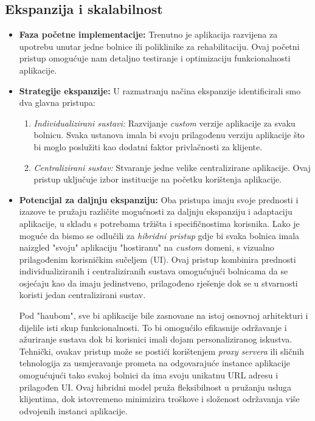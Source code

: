         \subsection*{Ekspanzija i skalabilnost}
        \begin{itemize}
            \item \textbf{Faza početne implementacije:} Trenutno je aplikacija razvijena za upotrebu unutar jedne bolnice ili poliklinike za rehabilitaciju. Ovaj početni pristup omogućuje nam detaljno testiranje i optimizaciju funkcionalnosti aplikacije.
            
            \item \textbf{Strategije ekspanzije:} U razmatranju načina ekspanzije identificirali smo dva glavna pristupa:
                \begin{enumerate}
                    \item \textit{Individualizirani sustavi:} Razvijanje \textit{custom} verzije aplikacije za svaku bolnicu. Svaka ustanova imala bi svoju prilagođenu verziju aplikacije što bi moglo poslužiti kao dodatni faktor privlačnosti za klijente.
                    
                    \item \textit{Centralizirani sustav:} Stvaranje jedne velike centralizirane aplikacije. Ovaj pristup uključuje izbor institucije na početku korištenja aplikacije.
                \end{enumerate}
            
            \item \textbf{Potencijal za daljnju ekspanziju:} Oba pristupa imaju svoje prednosti i izazove te pružaju različite mogućnosti za daljnju ekspanziju i adaptaciju aplikacije, u skladu s potrebama tržišta i specifičnostima korisnika. Lako je moguće da bismo se odlučili za \textit{hibridni pristup} gdje bi svaka bolnica imala naizgled "svoju" aplikaciju "hostiranu" na \textit{custom} domeni, s vizualno prilagođenim korisničkim sučeljem (UI). Ovaj pristup kombinira prednosti individualiziranih i centraliziranih sustava omogućujući bolnicama da se osjećaju kao da imaju jedinstveno, prilagođeno rješenje dok se u stvarnosti koristi jedan centralizirani sustav.

            Pod "haubom", sve bi aplikacije bile zasnovane na istoj osnovnoj arhitekturi i dijelile isti skup funkcionalnosti. To bi omogućilo efikasnije održavanje i ažuriranje sustava dok bi korisnici imali dojam personaliziranog iskustva. Tehnički, ovakav pristup može se postići korištenjem \textit{proxy servera} ili sličnih tehnologija za usmjeravanje prometa na odgovarajuće instance aplikacije omogućujući tako svakoj bolnici da ima svoju unikatnu URL adresu i prilagođen UI. Ovaj hibridni model pruža fleksibilnost u pružanju usluga klijentima, dok istovremeno minimizira troškove i složenost održavanja više odvojenih instanci aplikacije.

            \end{itemize}
            

